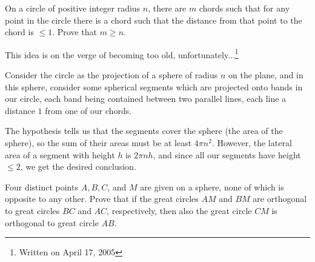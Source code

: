 	
\begin{question}
	On a circle of positive integer radius $n$, there are $m$ chords such that for any point in the circle there is a chord such that the distance from that point to the chord is $\leq 1$. Prove that $m \geq n$.
\end{question}


\begin{solution}[name={Solution by Grobber}] 
	This idea is on the verge of becoming too old, unfortunately...\footnote{Written on April 17, 2005}
	
	Consider the circle as the projection of a sphere of radius $n$ on the plane, and in this sphere, consider some spherical segments which are projected onto bands in our circle, each band being contained between two parallel lines, each line a distance $1$ from one of our chords.
	
	The hypothesis tells us that the segments cover the sphere (the area of the sphere), so the sum of their areas must be at least $4\pi n^2$. However, the lateral area of a segment with height $h$ is $2\pi nh$, and since all our segments have height $\le 2$, we get the desired conclusion.
\end{solution}



\begin{question}
	Four distinct points $A, B, C$, and $M$ are given on a sphere, none of which is opposite to any other. Prove that if the great circles $AM$ and $BM$ are orthogonal to great circles $BC$ and $AC$, respectively, then also the great circle $CM$ is orthogonal to great circle $AB$.
\end{question}


